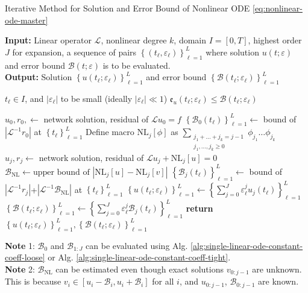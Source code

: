 \documentclass[accepted]{uai2023}
\newcommand{\Err}{\mathfrak{e}}
\newcommand{\Bound}{\mathcal{B}}
\renewcommand{\L}{\mathcal{L}}
\begin{document}
    \begin{algorithm}
        \small
        \caption{Iterative Method for Solution and Error Bound of Nonlinear ODE \ref{eq:nonlinear-ode-master}} \label{alg:nonlinear-iterative}
        \textbf{Input:} Linear operator $\L$, nonlinear degree $k$, domain $I=[0, T]$, highest order $J$ for expansion, a sequence of pairs $\left\{(t_\ell, \varepsilon_\ell)\right\}_{\ell=1}^{L}$ where solution $u(t; \varepsilon)$ and error bound $\Bound(t; \varepsilon)$ is to be evaluated. \\
        \textbf{Output:} Solution $\left\{u(t_\ell; \varepsilon_\ell)\right\}_{\ell=1}^{L}$ and error bound $\left\{\Bound(t_\ell; \varepsilon_\ell)\right\}_{\ell=1}^{L}$ 
        \begin{algorithmic}
            \Require $t_\ell \in I$, and $|\varepsilon_\ell|$ to be small (ideally $|\varepsilon_\ell| \ll 1$)
            \Ensure $\Err_{u}(t_\ell; \varepsilon_\ell) \leq \Bound(t_\ell; \varepsilon_\ell)$ 

            \State $u_0, r_0, \gets$ network solution, residual of $\L u_0 = f$
            \State $\left\{\Bound_{0}(t_\ell)\right\}_{\ell=1}^L \gets$ bound of $\left|\L^{-1}r_0\right|$ at $\left\{t_\ell\right\}_{\ell=1}^L$
                \State Define macro $\text{NL}_j[\phi]$ as $\sum_{\substack{j_1 + \dots + j_k = j-1\\ j_1, \dots, j_k \geq 0}} \phi_{j_1} \dots \phi_{j_k}$
                \State $u_j, r_j \gets$ network solution, residual of $\L u_j + \text{NL}_j[u] = 0$
                \State $\Bound_{\text{NL}} \gets \text{upper bound of }|\text{NL}_j[u] - \text{NL}_j[v]|$
                \State $\left\{\Bound_{j}(t_\ell)\right\}_{\ell=1}^L \gets$  bound of $|\L^{-1}r_j|$+$|\L^{-1}\Bound_{\text{NL}}|$ at $\left\{t_\ell\right\}_{\ell=1}^L$
            \EndFor
            \State $\left\{u(t_\ell; \varepsilon_\ell)\right\}_{\ell=1}^L \gets \left\{\sum_{j=0}^{J}\varepsilon_\ell^j u_j(t_\ell)\right\}_{\ell=1}^L $ 
            \State $\left\{\Bound(t_\ell; \varepsilon_\ell)\right\}_{\ell=1}^L \gets \left\{\sum_{j=0}^{J}\varepsilon_\ell^j \Bound_j(t_\ell)\right\}_{\ell=1}^L $ 
            \State \textbf{return} $\left\{u(t_\ell; \varepsilon_\ell)\right\}_{\ell=1}^L, \left\{\Bound(t_\ell; \varepsilon_\ell)\right\}_{\ell=1}^L$
        \end{algorithmic}
        \vspace{0.5em}

        \textbf{Note} 1: $\Bound_0$ and $\Bound_{1:J}$ can be evaluated using Alg. \ref{alg:single-linear-ode-constant-coeff-loose} or Alg. \ref{alg:single-linear-ode-constant-coeff-tight}.\\
        \textbf{Note} 2: $\Bound_\text{NL}$ can be estimated even though exact solutions $v_{0:j-1}$ are unknown. This is because $v_i \in [u_i - \Bound_i, u_i+\Bound_i]$ for all $i$, and $u_{0:j-1}$, $\Bound_{0:j-1}$ are known.
    \end{algorithm}
\end{document}
